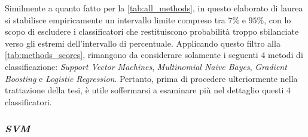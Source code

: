 \documentclass[12pt,a4paper,oneside]{article}
\begin{document}
Similmente a quanto fatto per la \cref{tab:all_methods}, in questo elaborato di laurea si stabilisce empiricamente un intervallo limite compreso tra $7\%$ e $95\%$, con lo scopo di escludere i classificatori che restituiscono probabilità troppo sbilanciate verso gli estremi dell'intervallo di percentuale. Applicando questo filtro alla \cref{tab:methods_scores}, rimangono da considerare solamente i seguenti $4$ metodi di classificazione: \textit{Support Vector Machines}, \textit{Multinomial Naive Bayes}, \textit{Gradient Boosting} e \textit{Logistic Regression}. Pertanto, prima di procedere ulteriormente nella trattazione della tesi, è utile soffermarsi a esaminare più nel dettaglio questi $4$ classificatori.



\subsubsection*{\textit{\gls{SVM}}}
\end{document}
